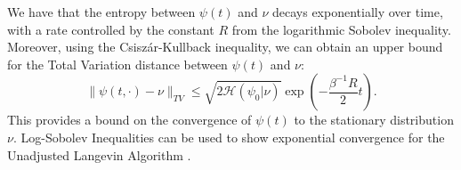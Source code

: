 \documentclass[11pt, twoside]{report}
\begin{document}

We have that the entropy between $\psi(t)$ and $\nu$ decays exponentially over time, with a rate controlled by the constant $R$ from the logarithmic Sobolev inequality. Moreover, using the Csisz\'{a}r-Kullback inequality, we can obtain an upper bound for the Total Variation distance between $\psi(t)$ and $\nu$:
\[
\|\psi(t, \cdot) - \nu\|_{TV} \leq \sqrt{2\mathcal{H}(\psi_0 | \nu)} \exp\left(-\frac{\beta^{-1}R}{2} t\right).
\]
This provides a bound on the convergence of $\psi(t)$ to the stationary distribution $\nu$. Log-Sobolev Inequalities can be used to show exponential convergence for the Unadjusted Langevin Algorithm \cite{Vempala2019}. 
\end{document}
